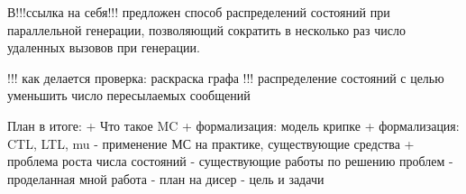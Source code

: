\documentclass[a4paper,notitlepage,14pt]{article}
\begin{document}
В!!!ссылка на себя!!! предложен способ распределений состояний при параллельной генерации,
позволяющий сократить в несколько раз число удаленных вызовов при генерации.

!!! как делается проверка: раскраска графа
!!! распределение состояний с целью уменьшить число пересылаемых сообщений

План в итоге:
+ Что такое MC
+ формализация: модель крипке
+ формализация: CTL, LTL, mu
- применение МС на практике, существующие средства
+ проблема роста числа состояний
- существующие работы по решению проблем
- проделанная мной работа
- план на дисер
- цель и задачи



\end{document}
